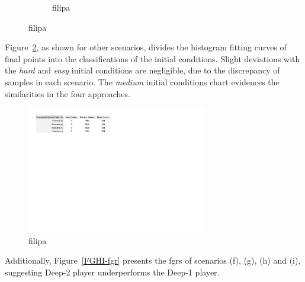 \begin{figure}[h]
\begin{subfigure}[h]{0.32\textwidth}
                \caption{filipa}
                \label{fig:FGHIeasy}
        \end{subfigure}
        \caption{filipa}
        \label{fig:FGHI-CH}
\end{figure}

Figure~\ref{fig:FGHI-CH}, as shown for other scenarios, divides the histogram fitting curves of final points into the classifications of the initial conditions.
Slight deviations with the \emph{hard} and \emph{easy} initial conditions are negligible, due to the discrepancy of samples in each scenario.
The \emph{medium} initial conditions chart evidences the similarities in the four approaches.

\begin{figure}[h!]
  \centering
    \includegraphics[width=0.7\textwidth]{./img/5/FGHI-fgr}
  \caption{filipa}
\label{fig:FGHI-fgr}
\end{figure}

Additionally, Figure~\ref{FGHI-fgr} presents the \acp{fgr} of scenarios (f), (g), (h) and (i), suggesting Deep-2 player underperforms the Deep-1 player.


